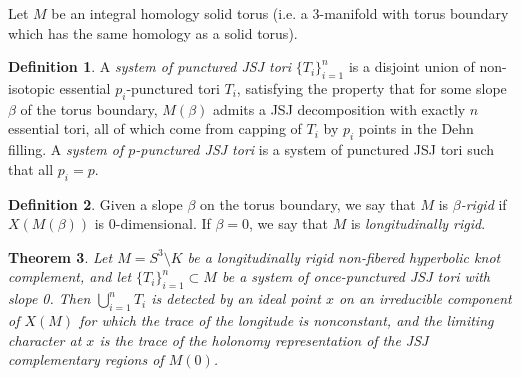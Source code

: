 \documentclass{article}
\theoremstyle{plain}
\newtheorem{theorem}{Theorem}[section]
\theoremstyle{definition}
\newtheorem{definition}[theorem]{Definition}
\theoremstyle{plain}
\theoremstyle{plain}
\theoremstyle{plain}
\theoremstyle{remark}
\theoremstyle{remark}
\theoremstyle{plain}
\theoremstyle{plain}
\begin{document}
Let $M$ be an integral homology solid torus (i.e. a 3-manifold with torus boundary which has the same homology as a solid torus). 



\begin{definition}
A \emph{system of punctured JSJ tori} $\{T_i\}_{i=1}^n$ is a disjoint union of non-isotopic essential $p_i$-punctured tori $T_i$, satisfying the property that for some slope $\beta$ of the torus boundary, $M(\beta)$ admits a JSJ decomposition with exactly $n$ essential tori, all of which come from capping of $T_i$ by $p_i$ points in the Dehn filling. A \emph{system of $p$-punctured JSJ tori} is a system of punctured JSJ tori such that all $p_i = p$. 
\end{definition}

\begin{definition}
Given a slope $\beta$ on the torus boundary, we say that $M$ is \emph{$\beta$-rigid} if $X(M(\beta))$ is 0-dimensional. If $\beta = 0$, we say that $M$ is \emph{longitudinally rigid}. 
\end{definition}

\begin{theorem}\cite{Wang}
Let $M = S^3 \setminus K$ be a longitudinally rigid non-fibered hyperbolic knot complement, and let $\{T_i\}_{i=1}^n \subset M$ be a system of once-punctured JSJ tori with slope 0. Then $\bigcup_{i=1}^nT_i$ is detected by an ideal point $x$ on an irreducible component of $X(M)$ for which the trace of the longitude is nonconstant, and the limiting character at $x$ is the trace of the holonomy representation of the JSJ complementary regions of $M(0)$. 
\end{theorem}
\end{document}
